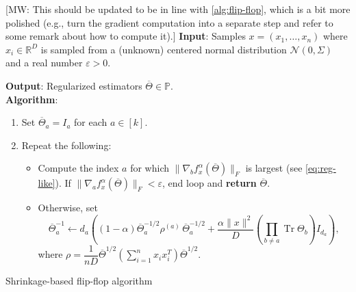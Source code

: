 \documentclass[aos]{imsart}
\theoremstyle{definition}
\numberwithin{equation}{section}
\DeclareMathOperator{\tr}{Tr}
\newcommand{\R}{{\mathbb{R}}}
\newcommand{\otheta}{\overline{\Theta}}
\newcommand{\eps}{\varepsilon}
\newcommand{\cN}{\mathcal{N}}
\newcommand{\SPD}{\mathbb{P}}
\newcommand{\samp}{x}
\newcommand{\MW}[1]{{\color{red}[MW: #1]}}
\newcommand{\MW}[1]{{}}
\begin{document}
\begin{Algorithm}
\MW{This should be updated to be in line with \cref{alg:flip-flop}, which is a bit more polished (e.g., turn the gradient computation into a separate step and refer to some remark about how to compute it).}
\textbf{Input}: Samples $\samp = (\samp_1, \ldots, \samp_n)$ where $\samp_i \in \R^D$ is sampled from a (unknown) centered normal distribution $\cN(0, \Sigma)$ and a real number $\eps > 0$.

\textbf{Output}: Regularized estimators $\otheta \in \SPD$.\\[.1ex]

\textbf{Algorithm}:
\begin{enumerate}
\item\label{it:flip-flop step 1 reg} Set $\otheta_a = I_a$ for each $a \in [k]$.
\item\label{it:flip-flop step 2 reg} Repeat the following:
\begin{itemize}
\item Compute the index $a$ for which $\|\nabla_b f^\alpha_{\samp}(\otheta)\|_F$ is largest (see \cref{eq:reg-like}). If $\|\nabla_a f^\alpha_\samp(\otheta)\|_F < \eps$, end loop and \textbf{return} $\overline{\Theta}$.
\item Otherwise, set
$$\otheta_a^{-1} \leftarrow  d_a \left((1 - \alpha) \otheta_a^{-1/2} \rho^{(a)} \, \otheta_a^{-1/2} + \frac{\alpha \|x\|^2}{D} (\prod_{b \neq a} \tr \Theta_b) I_{d_a}  \right),$$
where $\rho = \dfrac{1}{nD} \otheta^{1/2} \left( \sum_{i=1}^n x_ix_i^T \right) \otheta^{1/2}.$


\end{itemize}
\end{enumerate}
\caption{Shrinkage-based flip-flop algorithm}\label{alg:reg-flip-flop}
\end{Algorithm}

\end{document}

